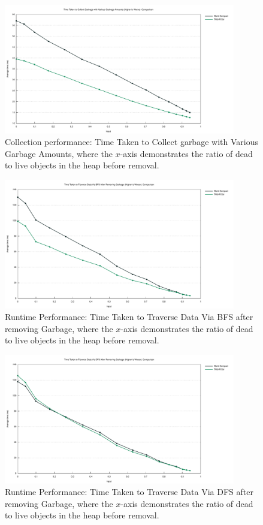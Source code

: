 \documentclass[index]{subfiles}
\begin{document}
\begin{figure}[H]
    \centering
    \includegraphics[width=0.9\textwidth]{pics/collect.pdf}
    \caption{Collection performance: Time Taken to Collect garbage with Various Garbage Amounts, where the \(x\)-axis demonstrates the ratio of dead to live objects in the heap before removal.}
\end{figure}
\begin{figure}[H]
    \centering
    \includegraphics[width=0.9\textwidth]{pics/bfs.pdf}
    \caption{Runtime Performance: Time Taken to Traverse Data Via BFS after removing Garbage, where the \(x\)-axis demonstrates the ratio of dead to live objects in the heap before removal.}
\end{figure}
\begin{figure}[H]
    \centering
    \includegraphics[width=0.9\textwidth]{pics/dfs.pdf}
    \caption{Runtime Performance: Time Taken to Traverse Data Via DFS after removing Garbage, where the \(x\)-axis demonstrates the ratio of dead to live objects in the heap before removal.}
\end{figure}
\end{document}
